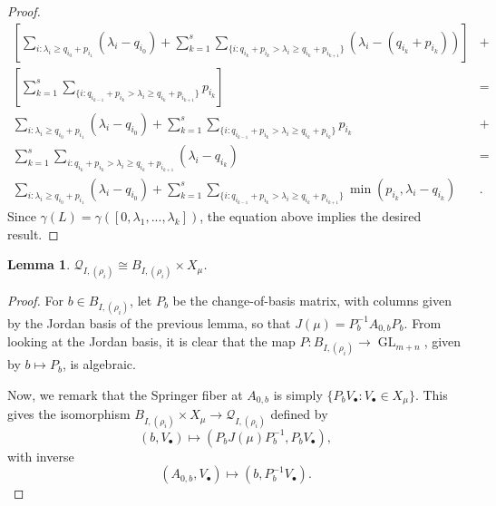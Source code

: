 \documentclass[12pt,psamsfonts]{article}
\DeclareMathOperator{\GL}{GL}
\newtheorem{lemma}[theorem]{Lemma}
\begin{document}
\begin{proof}
\begin{align*}
        \left[\sum_{i : \lambda_i \geq q_{i_0} + p_{i_1}} (\lambda_i - q_{i_0}) + \sum_{k = 1}^s \sum_{\{i : q_{i_k} + p_{i_k} > \lambda_i \geq q_{i_k} + p_{i_{k + 1}}\}} (\lambda_i - (q_{i_k} + p_{i_k}))\right] & + \\
        \left[\sum_{k = 1}^s \sum_{\{i : q_{i_{k - 1}} + p_{i_k} > \lambda_i \geq q_{i_k} + p_{i_{k + 1}}\}} p_{i_k}\right] & = \\
        \sum_{i : \lambda_i \geq q_{i_0} + p_{i_1}} (\lambda_i - q_{i_0}) + \sum_{k = 1}^s \sum_{\{i : q_{i_{k - 1}} + p_{i_k} > \lambda_i \geq q_{i_k} + p_{i_k}\}} p_{i_k} & + \\
        \sum_{k = 1}^s \sum_{i : q_{i_k} + p_{i_k} > \lambda_i \geq q_{i_k} + p_{i_{k + 1}}} (\lambda_i - q_{i_k}) & = \\
        \sum_{i : \lambda_i \geq q_{i_0} + p_{i_1}} (\lambda_i - q_{i_0}) + \sum_{k = 1}^s \sum_{\{i : q_{i_{k - 1}} + p_{i_k} > \lambda_i \geq q_{i_k} + p_{i_{k + 1}}\}} \min(p_{i_k}, \lambda_i - q_{i_k}) & .
    \end{align*}
    Since \(\gamma(L) = \gamma([0, \lambda_1, ..., \lambda_k])\), the equation above implies the desired result.
\end{proof}

\begin{lemma}\label{u_i_rho_iso}
    \(\mathcal{Q}_{I, (\rho_i)} \cong B_{I, (\rho_i)} \times X_\mu\).
\end{lemma}
\begin{proof}
    For \(b \in B_{I, (\rho_i)}\), let \(P_b\) be the change-of-basis matrix, with columns given by the Jordan basis of the previous lemma, so that \(J(\mu) = P_b^{-1} A_{0,b} P_b\).
    From looking at the Jordan basis, it is clear that the map \(P : B_{I, (\rho_i)} \to \GL_{m + n}\), given by \(b \mapsto P_b\), is algebraic.
    \par Now, we remark that the Springer fiber at \(A_{0,b}\) is simply \(\{P_b V_\bullet : V_\bullet \in X_\mu\}\).
    This gives the isomorphism \(B_{I, (\rho_i)} \times X_\mu \to \mathcal{Q}_{I, (\rho_i)}\) defined by
    \[(b, V_\bullet) \mapsto (P_b J(\mu) P_b^{-1}, P_b V_\bullet),\]
    with inverse
    \[(A_{0,b}, V_\bullet) \mapsto (b, P_b^{-1} V_\bullet).\]
\end{proof}
\end{document}

